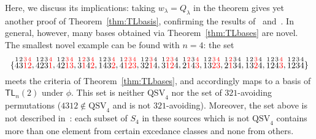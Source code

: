 \documentclass[submission]{FPSAC2024}
\theoremstyle{definition}
\theoremstyle{remark}
\newtheorem{rem}[equation]{Remark}
\numberwithin{equation}{section}
\newcommand{\TL}{\mathsf{TL}}
\newcommand{\QSV}{\mathrm{QSV}}
\begin{document}
Here, we discuss its implications: taking $w_{\lambda} = Q_{\lambda}$ in the theorem gives yet another proof of Theorem~\ref{thm:TLbasis}, confirming the results of~\cite{GW16} and~\cite{Z02}.  In general, however, many bases obtained via Theorem~\ref{thm:TLbases} are novel.  The smallest novel example can be found with $n = 4$: the set 
\[
\{
\stackrel{1}{4} \stackrel{2}{3} \color{red} \stackrel{3}{1} \stackrel{4}{2} \color{black}, 
\stackrel{1}{4} \stackrel{2}{2} \stackrel{3}{3}  \color{red} \stackrel{4}{1} \color{black}, 
\stackrel{1}{4} \stackrel{2}{2}\color{red}  \stackrel{3}{1} \stackrel{4}{3} \color{black}, 
\stackrel{1}{3} \color{red}  \stackrel{2}{1} \color{black} \stackrel{3}{4} \color{red} \stackrel{4}{2}\color{black} , 
\stackrel{1}{1} \stackrel{2}{4} \stackrel{3}{3} \color{red} \stackrel{4}{2} \color{black}, 
\stackrel{1}{4} \color{red} \stackrel{2}{1} \stackrel{3}{2} \stackrel{4}{3} \color{black}, 
\stackrel{1}{3} \stackrel{2}{2} \color{red} \stackrel{3}{1} \color{black} \stackrel{4}{4}, 
\stackrel{1}{3} \color{red} \stackrel{2}{1} \stackrel{3}{2} \color{black} \stackrel{4}{4}, 
\stackrel{1}{2} \color{red} \stackrel{2}{1} \color{black} \stackrel{3}{4} \color{red} \stackrel{4}{3} \color{black}, 
\stackrel{1}{1} \stackrel{2}{3} \color{red} \stackrel{3}{2} \stackrel{4}{3} \color{black}, 
\stackrel{1}{2}  \color{red} \stackrel{2}{1} \color{black} \stackrel{3}{3} \stackrel{4}{4}, 
\stackrel{1}{1} \stackrel{2}{3} \color{red} \stackrel{3}{2} \color{black} \stackrel{4}{4}, 
\stackrel{1}{1} \stackrel{2}{2} \stackrel{3}{4}  \color{red} \stackrel{4}{3} \color{black},
\stackrel{1}{1} \stackrel{2}{2} \stackrel{3}{3} \stackrel{4}{4}
\}
\]
meets the criteria of Theorem~\ref{thm:TLbases}, and accordingly maps to a basis of $\TL_{n}(2)$ under $\phi$. 
This set is neither $\QSV_{4}$ nor the set of $321$-avoiding permutations ($4312 \notin \QSV_{4}$ and is not $321$-avoiding).
Moreover, the set above is not described in~\cite{GW16, Z02}: each subset of $S_{4}$ in these sources which is not $\QSV_{4}$ contains more than one element from certain excedance classes and none from others.  
 
\end{document}

